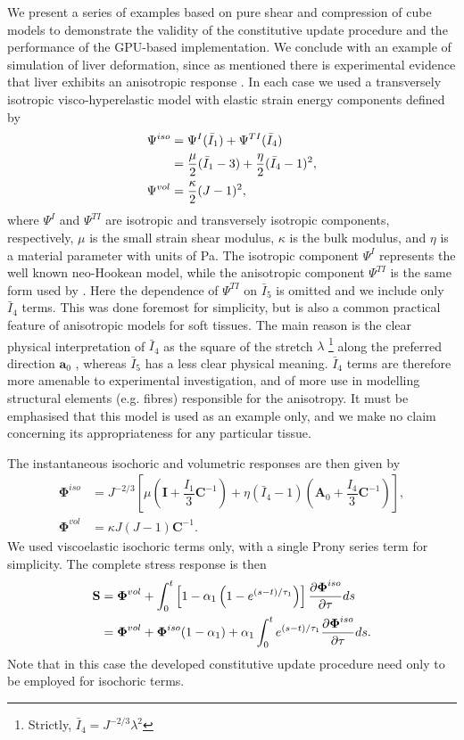 We present a series of examples based on pure shear and compression of cube models to demonstrate the validity of the constitutive update procedure and the performance of the GPU-based implementation. We conclude with an example of simulation of liver deformation, since as mentioned there is experimental evidence that liver exhibits an anisotropic response \citep{Chui07}. In each case we used a transversely isotropic visco-hyperelastic model with elastic strain energy components defined by
\begin{align}
\Psi^{iso} &= \Psi^{I}(\bar{I}_1) + \Psi^{TI}(\bar{I}_4) \notag \\
&= \dfrac{\mu}{2} (\bar{I}_1 - 3) + \dfrac{\eta}{2} (\bar{I}_4 - 1)^2, \\
\Psi^{vol} &= \dfrac{\kappa}{2} (J - 1)^2,
\end{align}
where $ \Psi^{I} $ and $ \Psi^{TI} $ are isotropic and transversely isotropic components, respectively, $ \mu $ is the small strain shear modulus, $ \kappa $ is the bulk modulus, and $ \eta $ is a material parameter with units of Pa. The isotropic component $ \Psi^{I} $ represents the well known neo-Hookean model, while the anisotropic component $ \Psi^{TI} $ is the same form used by \cite{Picinbono01}. Here the dependence of $ \Psi^{TI} $ on $ \bar{I}_5 $ is omitted and we include only $ \bar{I}_4 $ terms. This was done foremost for simplicity, but is also a common practical feature of anisotropic models for soft tissues. The main reason is the clear physical interpretation of $ \bar{I}_4 $ as the square of the stretch $ \lambda $ \footnote{Strictly, $ \bar{I}_4 = J^{-2/3} \lambda^2 $} along the preferred direction $ \mathbf{a}_0 $ \cite{Holzapfel00}, whereas $ \bar{I}_5 $ has a less clear physical meaning. $ \bar{I}_4 $ terms are therefore more amenable to experimental investigation, and of more use in modelling structural elements (e.g. fibres) responsible for the anisotropy. It must be emphasised that this model is used as an example only, and we make no claim concerning its appropriateness for any particular tissue.

\bigskip

The instantaneous isochoric and volumetric responses are then given by
\begin{align}
\boldsymbol \Phi^{iso} &= J^{-2/3} \left[ \mu \left( \mathbf{I} + \dfrac{I_1}{3} \mathbf{C}^{-1} \right) + \eta (\bar{I}_4 - 1) \left( \mathbf{A}_0 + \dfrac{I_4}{3} \mathbf{C}^{-1} \right) \right], \\
\boldsymbol \Phi^{vol} &= \kappa J (J - 1) \mathbf{C}^{-1}.
\end{align}
We used viscoelastic isochoric terms only, with a single Prony series term for simplicity. The complete stress response is then
\begin{align}
\mathbf{S} &= \boldsymbol \Phi^{vol} + \int_0^t \left[ 1 - \alpha_1 \left(1-e^{(s-t)/\tau_1} \right) \right] \dfrac{\partial \boldsymbol \Phi^{iso}}{\partial \tau} ds \notag \\
&= \boldsymbol \Phi^{vol} + \boldsymbol \Phi^{iso}(1 - \alpha_1) + \alpha_1 \int_0^t e^{(s-t)/\tau_1} \dfrac{\partial \boldsymbol \Phi^{iso}}{\partial \tau} ds.
\end{align}
Note that in this case the developed constitutive update procedure need only to be employed for isochoric terms. 

